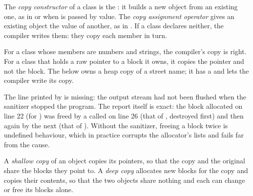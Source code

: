 \begin{definition}\label{def:b2:cpp-copy-move:copy}
The \emph{copy constructor} of a class  is the  : it
builds a new object from an existing one, as in  or when  is passed by value. The \emph{copy
assignment operator}  gives an existing object the value
of another, as in . If a class declares neither, the compiler writes them: they copy each member in turn.
\end{definition}

For a class whose members are numbers and strings, the compiler's copy is right. For a class that holds a raw
pointer to a block it owns, it copies the pointer and not the block. The  below owns a heap copy of a
street name; it has a  and lets the compiler write its copy.

\label{lst:b2:cpp-copy-move:shallow}

\label{out:b2:cpp-copy-move:shallow}

The line printed by  is missing: the output stream had not been flushed when the sanitizer stopped the
program. The report itself is exact: the block allocated on line 22 (for ) was freed by a  called
on line 26 (that of , destroyed first) and then again by the next  (that of ). Without the
sanitizer, freeing a block twice is undefined behaviour, which in practice corrupts the allocator's lists and fails
far from the cause.

\begin{definition}\label{def:b2:cpp-copy-move:deep}
A \emph{shallow copy} of an object copies its pointers, so that the copy and the original share
the blocks they point to. A \emph{deep copy} allocates new blocks for the copy and copies their
contents, so that the two objects share nothing and each can change or free its blocks alone.
\end{definition}


